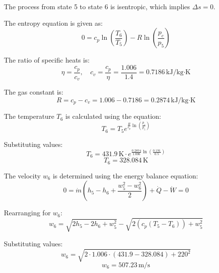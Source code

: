 The process from state 5 to state 6 is isentropic, which implies \( \Delta s = 0 \).  

The entropy equation is given as:  
\[
0 = c_p \ln\left(\frac{T_6}{T_5}\right) - R \ln\left(\frac{p_c}{p_5}\right)
\]  

The ratio of specific heats is:  
\[
\eta = \frac{c_p}{c_v}, \quad c_v = \frac{c_p}{\eta} = \frac{1.006}{1.4} = 0.7186 \, \text{kJ}/\text{kg·K}
\]  

The gas constant is:  
\[
R = c_p - c_v = 1.006 - 0.7186 = 0.2874 \, \text{kJ}/\text{kg·K}
\]  

The temperature \( T_6 \) is calculated using the equation:  
\[
T_6 = T_5 e^{\frac{R}{c_p} \ln\left(\frac{p_c}{p_5}\right)}
\]  

Substituting values:  
\[
T_6 = 431.9 \, \text{K} \cdot e^{\frac{0.2874}{1.006} \ln\left(\frac{0.191}{0.5}\right)}  
\]  
\[
T_6 = 328.084 \, \text{K}
\]  

The velocity \( w_6 \) is determined using the energy balance equation:  
\[
0 = \dot{m} \left(h_5 - h_6 + \frac{w_5^2 - w_6^2}{2}\right) + \dot{Q} - \dot{W} = 0
\]  

Rearranging for \( w_6 \):  
\[
w_6 = \sqrt{2 h_5 - 2 h_6 + w_5^2} - \sqrt{2 \left(c_p (T_5 - T_6)\right) + w_5^2}
\]  

Substituting values:  
\[
w_6 = \sqrt{2 \cdot 1.006 \cdot (431.9 - 328.084) + 220^2}  
\]  
\[
w_6 = 507.23 \, \text{m/s}
\]